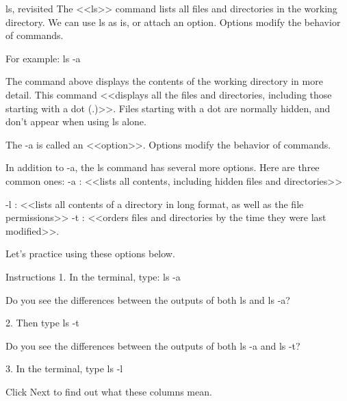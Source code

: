 ls, revisited
    The <<ls>> command lists all files and directories in the working directory. We can use ls as is, or attach an option. Options modify the behavior of commands.

    For example:
        ls -a
    
    The command above displays the contents of the working directory in more detail. This command <<displays all the files and directories, including those starting with a dot (.)>>. Files starting with a dot are normally hidden, and don’t appear when using ls alone.

    The -a is called an <<option>>. Options modify the behavior of commands.

    In addition to -a, the ls command has several more options. Here are three common ones:
        -a : <<lists all contents, including hidden files and directories>>
        
        -l : <<lists all contents of a directory in long format, as well as the file permissions>>
        -t : <<orders files and directories by the time they were last modified>>.
        
    Let’s practice using these options below.

Instructions
    1.
    In the terminal, type:
        ls -a 

    Do you see the differences between the outputs of both ls and ls -a?

    2.
    Then type
        ls -t

    Do you see the differences between the outputs of both ls -a and ls -t?

    3.
    In the terminal, type
        ls -l 
    
    Click Next to find out what these columns mean.